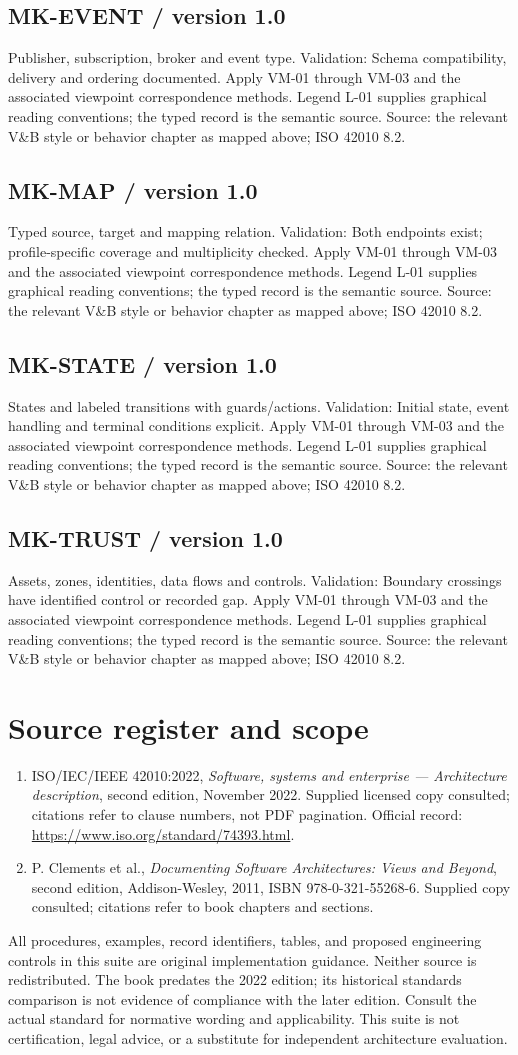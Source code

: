 \documentclass[11pt,letterpaper]{article}
\newcommand{\docsection}[1]{\Needspace{5\baselineskip}\section{#1}}
\newcommand{\docsub}[1]{\Needspace{4\baselineskip}\subsection{#1}}
\begin{document}
\docsub{MK-EVENT / version 1.0}
Publisher, subscription, broker and event type. Validation: Schema compatibility, delivery and ordering documented. Apply VM-01 through VM-03 and the associated viewpoint correspondence methods. Legend L-01 supplies graphical reading conventions; the typed record is the semantic source. Source: the relevant V\&B style or behavior chapter as mapped above; ISO 42010 8.2.

\docsub{MK-MAP / version 1.0}
Typed source, target and mapping relation. Validation: Both endpoints exist; profile-specific coverage and multiplicity checked. Apply VM-01 through VM-03 and the associated viewpoint correspondence methods. Legend L-01 supplies graphical reading conventions; the typed record is the semantic source. Source: the relevant V\&B style or behavior chapter as mapped above; ISO 42010 8.2.

\docsub{MK-STATE / version 1.0}
States and labeled transitions with guards/actions. Validation: Initial state, event handling and terminal conditions explicit. Apply VM-01 through VM-03 and the associated viewpoint correspondence methods. Legend L-01 supplies graphical reading conventions; the typed record is the semantic source. Source: the relevant V\&B style or behavior chapter as mapped above; ISO 42010 8.2.

\docsub{MK-TRUST / version 1.0}
Assets, zones, identities, data flows and controls. Validation: Boundary crossings have identified control or recorded gap. Apply VM-01 through VM-03 and the associated viewpoint correspondence methods. Legend L-01 supplies graphical reading conventions; the typed record is the semantic source. Source: the relevant V\&B style or behavior chapter as mapped above; ISO 42010 8.2.

\docsection{Source register and scope}
\begin{enumerate}
\item ISO/IEC/IEEE 42010:2022, \emph{Software, systems and enterprise --- Architecture description}, second edition, November 2022. Supplied licensed copy consulted; citations refer to clause numbers, not PDF pagination. Official record: \url{https://www.iso.org/standard/74393.html}.
\item P. Clements et al., \emph{Documenting Software Architectures: Views and Beyond}, second edition, Addison-Wesley, 2011, ISBN 978-0-321-55268-6. Supplied copy consulted; citations refer to book chapters and sections.
\end{enumerate}
All procedures, examples, record identifiers, tables, and proposed engineering controls in this suite are original implementation guidance. Neither source is redistributed. The book predates the 2022 edition; its historical standards comparison is not evidence of compliance with the later edition. Consult the actual standard for normative wording and applicability. This suite is not certification, legal advice, or a substitute for independent architecture evaluation.
\end{document}
